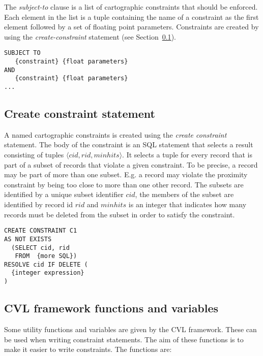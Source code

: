 The \emph{subject-to} clause is a list of cartographic constraints that should be enforced. Each element in the list is a tuple containing the name of a constraint as the first element followed by a set of floating point parameters. Constraints are created by using the \emph{create-constraint} statement (see Section~\ref{sec:create-constraint-statement}).

\begin{lstlisting}
SUBJECT TO 
   {constraint} {float parameters} 
AND
   {constraint} {float parameters}
...
\end{lstlisting}

\subsection{Create constraint statement}
\label{sec:create-constraint-statement}

A named cartographic constraints is created using the \emph{create constraint} statement. The body of the constraint is an SQL statement that selects a result consisting of tuples $\langle cid, rid, minhits \rangle$. It selects a tuple for every record that is part of a subset of records that violate a given constraint. To be precise, a record may be part of more than one subset. E.g. a record may violate the proximity constraint by being too close to more than one other record. The subsets are identified by a unique subset identifier $cid$,  the members of the subset are identified by record id $rid$ and $minhits$ is an integer that indicates how many records must be deleted from the subset in order to satisfy the constraint.

\begin{lstlisting}
CREATE CONSTRAINT C1
AS NOT EXISTS
  (SELECT cid, rid
   FROM  {more SQL})
RESOLVE cid IF DELETE (
  {integer expression}
)

\end{lstlisting}

\subsection{CVL framework functions and variables}


Some utility functions and variables are given by the CVL framework. These can be used when writing constraint statements. The aim of these functions is to make it easier to write constraints. The functions are:

